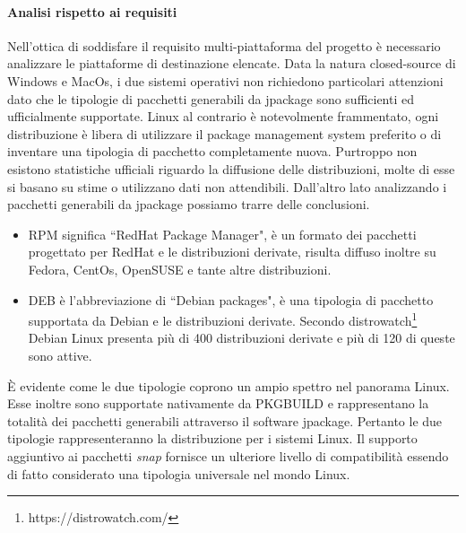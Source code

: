 \paragraph{Analisi rispetto ai requisiti}
Nell'ottica di soddisfare il requisito multi-piat\-ta\-for\-ma del progetto è necessario analizzare le piattaforme di destinazione elencate. Data la natura closed-source di Windows e MacOs, i due sistemi operativi non richiedono particolari attenzioni dato che le tipologie di pacchetti generabili da jpackage sono sufficienti ed ufficialmente supportate. Linux al contrario è notevolmente frammentato, ogni distribuzione è libera di utilizzare il package management system preferito o di inventare una tipologia di pacchetto completamente nuova. Purtroppo non esistono statistiche ufficiali riguardo la diffusione delle distribuzioni, molte di esse si basano su stime o utilizzano dati non attendibili. Dall'altro lato analizzando i pacchetti generabili da jpackage possiamo trarre delle conclusioni.
\begin{itemize}
	\item RPM significa ``RedHat Package Manager", è un formato dei pacchetti progettato per RedHat e le distribuzioni derivate, risulta diffuso inoltre su Fedora, CentOs, OpenSUSE e tante altre distribuzioni. 
	\item DEB è l'abbreviazione di ``Debian packages", è una tipologia di pacchetto supportata da Debian e le distribuzioni derivate. Secondo distrowatch\footnote{https://distrowatch.com/} Debian Linux presenta più di 400 distribuzioni derivate e più di 120 di queste sono attive.
\end{itemize}
È evidente come le due tipologie coprono un ampio spettro nel panorama Linux. Esse inoltre sono supportate nativamente da PKGBUILD e rappresentano la totalità dei pacchetti generabili attraverso il software jpackage. Pertanto le due tipologie rappresenteranno la distribuzione per i sistemi Linux. Il supporto aggiuntivo ai pacchetti \textit{snap} fornisce un ulteriore livello di compatibilità essendo di fatto considerato una tipologia universale nel mondo Linux.

